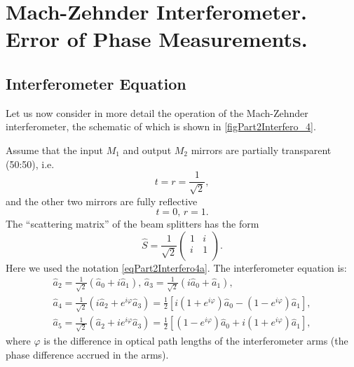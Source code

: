 \section{Mach-Zehnder Interferometer. Error of Phase Measurements.}
\subsection{Interferometer Equation}
Let us now consider in more detail the operation of the Mach-Zehnder interferometer,
the schematic of which is shown in \autoref{figPart2Interfero_4}.



Assume that the input $M_1$ and output $M_2$ mirrors are partially transparent
(50:50), i.e.
\[
t = r = \frac{1}{\sqrt{2}},
\]
and the other two mirrors are fully reflective
\[
t = 0, \, r = 1.
\]
The ``scattering matrix'' of the beam splitters has the form
\begin{equation}
\hat{S} = \frac{1}{\sqrt{2}} 
\left(
\begin{array}{cc}
1 & i \\
i & 1 \\
\end{array}
\right).
\nonumber
\end{equation}
Here we used the notation \eqref{eqPart2Interfero4a}. 
The interferometer equation is:
\begin{eqnarray}
\hat{a}_2 = \frac{1}{\sqrt{2}} \left(\hat{a}_0 + i \hat{a}_1\right),
\,
\hat{a}_3 = \frac{1}{\sqrt{2}} \left(i \hat{a}_0 + \hat{a}_1\right),
\nonumber \\
\hat{a}_4 = \frac{1}{\sqrt{2}} \left(i \hat{a}_2 + e^{i \varphi}
\hat{a}_3\right) = 
\frac{1}{2}\left[
i \left(1 + e^{i \varphi}\right)\hat{a}_0 -
\left(1 - e^{i \varphi}\right)\hat{a}_1
\right],
\nonumber \\
\hat{a}_5 = \frac{1}{\sqrt{2}} \left(\hat{a}_2 + i e^{i \varphi}
\hat{a}_3\right) = 
\frac{1}{2}\left[
\left(1 - e^{i \varphi}\right)\hat{a}_0 +
i \left(1 + e^{i \varphi}\right)\hat{a}_1
\right],
\label{eqPart2Interfero11}
\end{eqnarray}
where $\varphi$ is the difference in optical path lengths of the interferometer arms (the phase difference accrued in the arms).

